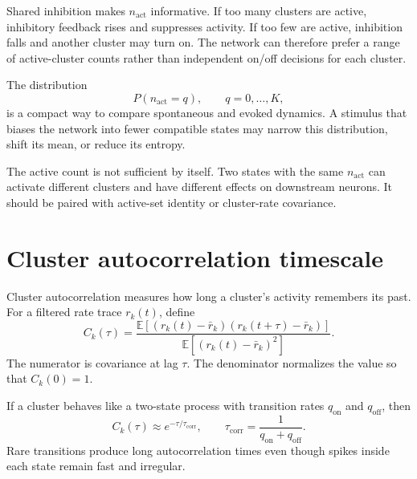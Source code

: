 Shared inhibition makes $n_{\mathrm{act}}$ informative. If too many clusters are active, inhibitory feedback rises and suppresses activity. If too few are active, inhibition falls and another cluster may turn on. The network can therefore prefer a range of active-cluster counts rather than independent on/off decisions for each cluster.

The distribution
%
\begin{equation}
  P(n_{\mathrm{act}}=q),
  \qquad q=0,\ldots,K,
  \label{eq:active-count-distribution}
\end{equation}
%
is a compact way to compare spontaneous and evoked dynamics. A stimulus that biases the network into fewer compatible states may narrow this distribution, shift its mean, or reduce its entropy.

The active count is not sufficient by itself. Two states with the same $n_{\mathrm{act}}$ can activate different clusters and have different effects on downstream neurons. It should be paired with active-set identity or cluster-rate covariance.

\section{Cluster autocorrelation timescale}
\label{sec:cluster-autocorrelation-timescale}

Cluster autocorrelation measures how long a cluster's activity remembers its past. For a filtered rate trace $r_k(t)$, define
%
\begin{equation}
  C_k(\tau)
  =
  \frac{
    \mathbb{E}\!\left[(r_k(t)-\bar r_k)(r_k(t+\tau)-\bar r_k)\right]
  }{
    \mathbb{E}\!\left[(r_k(t)-\bar r_k)^2\right]
  }.
  \label{eq:cluster-autocorrelation}
\end{equation}
%
The numerator is covariance at lag $\tau$. The denominator normalizes the value so that $C_k(0)=1$.

If a cluster behaves like a two-state process with transition rates $q_{\mathrm{on}}$ and $q_{\mathrm{off}}$, then
%
\begin{equation}
  C_k(\tau)
  \approx
  e^{-\tau/\tau_{\mathrm{corr}}},
  \qquad
  \tau_{\mathrm{corr}}
  =
  \frac{1}{q_{\mathrm{on}}+q_{\mathrm{off}}}.
  \label{eq:two-state-cluster-correlation}
\end{equation}
%
Rare transitions produce long autocorrelation times even though spikes inside each state remain fast and irregular.

